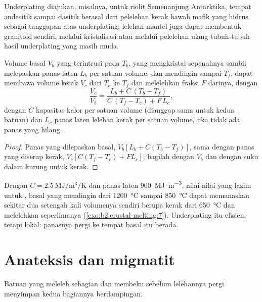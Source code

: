 Underplating diajukan, misalnya, untuk riolit Semenanjung Antarktika,
tempat  andesitik sampai dasitik berasal dari pelelehan kerak bawah mafik yang hidrus sebagai
tanggapan atas underplating; lelehan mantel juga dapat membentuk granitoid sendiri, melalui
kristalisasi atau melalui pelelehan ulang tubuh-tubuh hasil underplating yang masih muda.

\begin{proposition}\label{prop:b2:crustal-melting:heat}
Volume basal $V_b$ yang terintrusi pada $T_b$, yang mengkristal sepenuhnya sambil melepaskan
panas laten $L_b$ per satuan volume, dan mendingin sampai $T_f$, dapat membawa volume kerak $V_c$
dari $T_c$ ke $T_f$ dan melelehkan fraksi $F$ darinya, dengan
\[\frac{V_c}{V_b} = \frac{L_b + C\,(T_b - T_f)}{C\,(T_f - T_c) + F\,L_c},\]
dengan $C$ kapasitas kalor per satuan volume (dianggap sama untuk kedua batuan) dan $L_c$
panas laten lelehan kerak per satuan volume, jika tidak ada panas yang hilang.
\end{proposition}

\begin{proof}
Panas yang dilepaskan basal, $V_b[L_b + C(T_b - T_f)]$, sama dengan panas yang diserap
kerak, $V_c[C(T_f - T_c) + F L_c]$; bagilah dengan $V_b$ dan dengan suku dalam kurung untuk kerak.
\end{proof}

Dengan $C = \qty{2.5}{\mega\joule\per\cubic\metre\per\kelvin}$ dan panas laten
\qty{900}{\mega\joule\per\cubic\metre}, nilai-nilai yang lazim untuk , basal yang mendingin dari
\qty{1200}{\celsius} sampai \qty{850}{\celsius} dapat memanaskan sekitar dua setengah kali volumenya sendiri
berupa kerak dari \qty{650}{\celsius} dan melelehkan seperlimanya (\cref{exo:b2:crustal-melting:7}).
Underplating itu efisien, tetapi lokal: panasnya pergi ke tempat basal itu berada.

\section{Anateksis dan migmatit}\label{sec:b2:crustal-melting:migmatites}

Batuan yang meleleh sebagian dan membeku sebelum lelehannya pergi menyimpan kedua bagiannya berdampingan.

